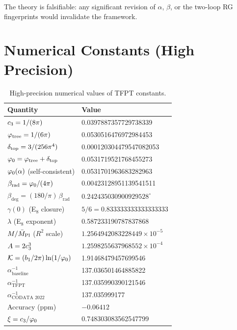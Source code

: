The theory is falsifiable: any significant revision of $\alpha$, $\beta$, 
or the two-loop RG fingerprints would invalidate the framework.

\appendix
\section{Numerical Constants (High Precision)}

\begin{table}[H]
\centering
\begin{tabular}{@{}ll@{}}
\toprule
\textbf{Quantity} & \textbf{Value}\\
\midrule
$c_3 = 1/(8\pi)$ & 0.0397887357729738339\\
$\varphi_{\mathrm{tree}} = 1/(6\pi)$ & 0.0530516476972984453\\
$\delta_{\mathrm{top}} = 3/(256\pi^4)$ & 0.000120304479547082053\\
$\varphi_0 = \varphi_{\mathrm{tree}} + \delta_{\mathrm{top}}$ & 0.0531719521768455273\\
$\varphi_0(\alpha)$ (self-consistent) & 0.0531701963683282963\\
$\beta_{\text{rad}} = \varphi_0/(4\pi)$ & 0.00423128951139541511\\
$\beta_{\text{deg}} = (180/\pi)\,\beta_{\text{rad}}$ & $0.242435030900929528^\circ$\\
$\gamma(0)$ (E$_8$ closure) & $5/6 = 0.833333333333333333$\\
$\lambda$ (E$_8$ exponent) & 0.587233190787837868\\
$M/\bar{M}_{\mathrm{Pl}}$ ($R^2$ scale) & $1.2564942083228449\times 10^{-5}$\\
$A = 2c_3^3$ & $1.2598255637968552 \times 10^{-4}$\\
$\mathcal{K} = (b_1/2\pi)\ln(1/\varphi_0)$ & 1.91468479457699546\\
$\alpha^{-1}_{\text{baseline}}$ & 137.036501464885822\\
$\alpha^{-1}_{\text{TFPT}}$ & 137.035990390121546\\
$\alpha^{-1}_{\text{CODATA 2022}}$ & 137.035999177\\
Accuracy (ppm) & $-0.06412$\\
$\xi = c_3/\varphi_0$ & 0.748303083562547799\\
\bottomrule
\end{tabular}
\caption{High-precision numerical values of TFPT constants.}
\label{tab:constants}
\end{table}

